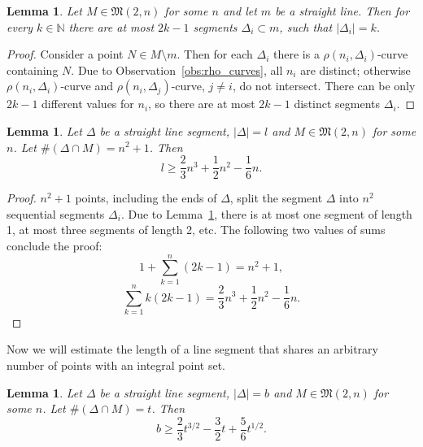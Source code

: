 \documentclass[a4paper,14pt]{article} %
\theoremstyle{plain}
\newtheorem{lemma}[theorem]{Lemma}
\theoremstyle{definition}
\begin{document}
\begin{lemma}
	\label{lem:2k-1_segments}
	Let $M \in \mathfrak{M}(2,n)$ for some $n$ and let $m$ be a straight line.
	Then for every $k\in\mathbb{N}$ there are at most $2k-1$ segments $\Delta_i \subset m$,
	such that $|\Delta_i| = k$.
\end{lemma}
\begin{proof}
	Consider a point $N\in M \setminus m$.
	Then for each $\Delta_i$ there is a $\rho(n_i,\Delta_i)$-curve containing $N$.
	Due to Observation~\ref{obs:rho_curves}, all $n_i$ are distinct;
	otherwise $\rho(n_i,\Delta_i)$-curve and $\rho(n_i,\Delta_j)$-curve, $j\neq i$, do not intersect.
	There can be only $2k-1$ different values for $n_i$,
	so there are at most $2k-1$ distinct segments $\Delta_i$.
\end{proof}

\begin{lemma}
	\label{lem:line_segment_with n_squared_plus_one_points}
	Let $\Delta$ be a straight line segment, $|\Delta|=l$ and $M \in \mathfrak{M}(2,n)$ for some $n$.
	Let $\#(\Delta \cap M) = n^2 + 1$.
	Then
	\begin{equation}
		l \geq \frac{2}{3}n^3+\frac{1}{2}n^2-\frac{1}{6}n
		.
	\end{equation}
\end{lemma}

\begin{proof}
	$n^2+1$ points, including the ends of $\Delta$, split the segment $\Delta$ into $n^2$
	sequential segments $\Delta_i$.
	Due to Lemma~\ref{lem:2k-1_segments}, there is at most one segment of length 1,
	at most three segments of length 2, etc.
	The following two values of sums conclude the proof:
	\begin{equation}
		1 + \sum_{k=1}^n (2k-1) = n^2 + 1
		,
	\end{equation}
	\begin{equation}
		\sum_{k=1}^n k(2k-1) = \frac{2}{3}n^3+\frac{1}{2}n^2-\frac{1}{6}n
		.
	\end{equation}
\end{proof}

Now we will estimate the length of a line segment that shares an arbitrary number of points
with an integral point set.

\begin{lemma}
	Let $\Delta$ be a straight line segment, $|\Delta| = b$ and $M \in \mathfrak{M}(2,n)$ for some $n$.
	Let $\#(\Delta \cap M) = t$.
	Then
	\begin{equation}
		\label{eq:estimate_for_segment_length}
		b\geq \frac{2}{3}t^{3/2}-\frac{3}{2}t+\frac{5}{6}t^{1/2}
		.
	\end{equation}
\end{lemma}
\end{document}
